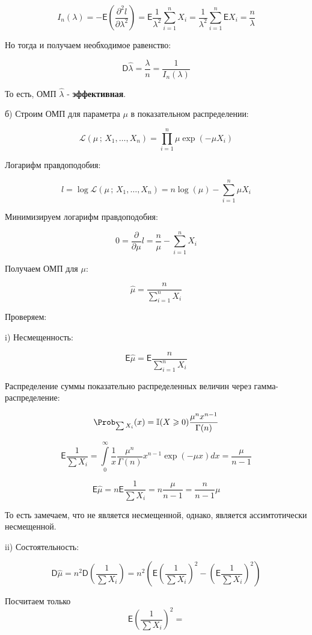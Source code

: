 \documentclass[12pt]{article}
\theoremstyle{definiton}
\theoremstyle{definition}
\theoremstyle{definition}
\let\geq\geqslant
\newcommand{\Expect}{\mathsf{E}}
\newcommand{\Disp}{\mathsf{D}}
\begin{document}
$$I_n(\lambda) = -  \Expect \left(\frac{\partial^2 l}{\partial \lambda^2}\right) = \Expect \frac{1}{\lambda^2} \sum\limits_{i=1}^n X_i = \frac{1}{\lambda^2} \sum\limits_{i=1}^n \Expect X_i = \frac{n}{\lambda}$$


Но тогда и получаем необходимое равенство:

$$\mathsf{D}\hat\lambda = \frac{\lambda}{n} = \frac{1}{I_n(\lambda)}$$

То есть, ОМП $\hat\lambda$ - \textbf{эффективная}.

\bigskip

б)  Строим ОМП для параметра $\mu$ в показательном распределении:

$$\mathcal{L}(\mu \,;\,X_1,\ldots,X_n) = \prod\limits_{i=1}^n \mu \exp{(-\mu X_i)}$$

Логарифм правдоподобия:

$$l = \log \mathcal{L}(\mu \,;\,X_1,\ldots,X_n) = n \log (\mu) - \sum\limits_{i=1}^n \mu X_i  $$

Минимизируем логарифм правдоподобия:

$$0 = \frac{\partial}{\partial \mu} l = \frac{n}{\mu} - \sum\limits_{i=1}^n X_i$$

Получаем ОМП для $\mu$:

$$\hat \mu = \frac{n}{\sum\limits_{i=1}^n X_i}$$


Проверяем: 

i) Несмещенность:

$$\Expect \hat \mu  = \Expect \frac{n}{\sum\limits_{i=1}^n X_i}$$

Распределение суммы показательно распределенных величин через гамма-распределение:

$$\Prob_{\sum X_i} (x) = \mathbb{I}(X \geq 0) \frac{\mu^n x^{n-1}}{\Gamma(n)}$$


$$\Expect \frac{1}{\sum X_i} = \int\limits_0^{\infty} \frac{1}{x} \frac{\mu^n}{\Gamma(n)} x^{n-1} \exp{(-\mu x)} dx = \frac{\mu}{n-1}$$

$$\Expect \hat \mu = n \Expect \frac{1}{\sum X_i} = n \frac{\mu}{n-1} = \frac{n}{n-1} \mu$$

То есть замечаем, что не является несмещенной, однако, является ассимтотически несмещенной.


ii) Состоятельность:

$$\Disp \hat\mu = n^2 \Disp \left(\frac{1}{\sum X_i} \right) = n^2 \left( \Expect  \left(\frac{1}{\sum X_i} \right)^2 -  \left(\Expect\frac{1}{\sum X_i}\right)^2 \right) $$

Посчитаем только $$\Expect  \left(\frac{1}{\sum X_i} \right)^2 = $$
\end{document}
